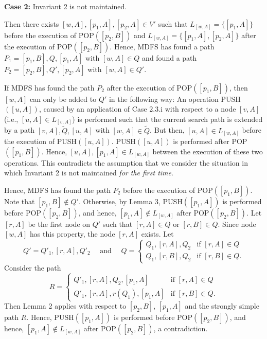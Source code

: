 \documentclass[12pt,twoside,a4paper]{article}
\begin{document}
\medskip
\noindent
{\bf Case 2:} Invariant 2 is not maintained.

\medskip
Then there exists $[w,A],[p_1,A],[p_2,A] \in V'$ such that 
$L_{[w,A]} = \{[p_1,A]\}$ before the execution of POP$([p_2,B])$ and 
$L_{[w,A]} = \{[p_1,A],[p_2,A]\}$  after the execution of POP$([p_2,B])$.
Hence, MDFS has found a path $P_1 = [p_1,B],Q,[p_1,A]$ with $[w,A] \in Q$ and 
found a path $P_2 = [p_2,B],Q',[p_2,A]$ with $[w,A] \in Q'$.

If MDFS has found the path $P_2$ after the execution of POP$([p_1,B])$, then
$[w,A]$ can only be added to $Q'$ in the following way:
An operation PUSH$([u,A])$, caused by an application of Case 2.3.i
with respect to a node $[v,A]$ (i.e., $[u,A] \in L_{[v,A]}$) is performed 
such that the current search path is extended by a path $[v,A],\tilde{Q},[u,A]$
with $[w,A] \in \tilde{Q}$.
But then, $[u,A] \in L_{[w,A]}$ before the execution of PUSH$([u,A])$. 
PUSH$([u,A])$ is performed after POP$([p_1,B])$. Hence, $[u,A],[p_1,A]\in 
L_{[w,A]}$ between the execution of these two operations.
This contradicts the assumption that we consider the situation in
which Invariant 2 is not maintained {\em for the first time\/}.

Hence, MDFS has found the path $P_2$ before the execution of POP$([p_1,B])$. 
Note that $[p_1,B] \not\in Q'$. Otherwise, by Lemma 3, 
PUSH$([p_1,A])$ is performed before POP$([p_2,B])$, and hence, $[p_1,A] 
\not\in L_{[w,A]}$ after POP$([p_2,B])$. 
Let $[r,A]$ be the first node on $Q'$ such that $[r,A] \in Q$ or $[r,B] \in
Q$. Since node $[w,A]$ has this property, the node $[r,A]$ exists. Let 
$$Q' = Q'_1,[r,A],Q'_2 \quad \mbox{ and } \quad
Q = \left\{ \begin{array}{ll}
                Q_1,[r,A],Q_2 & \mbox{if $[r,A] \in Q$} \\
                Q_1,[r,B],Q_2 & \mbox{if $[r,B] \in Q$.}
              \end{array}
      \right.$$   
Consider the path
$$R = \left\{ \begin{array}{ll}
                Q'_1,[r,A],Q_2,[p_1,A] & \mbox{if $[r,A] \in Q$} \\
                Q'_1,[r,A],r(Q_1),[p_1,A] & \mbox{if $[r,B] \in Q$.}
              \end{array}
      \right.$$
Then Lemma 2 applies with respect to $[p_2,B]$, $[p_1,A]$ and the
strongly simple path $R$. Hence, PUSH$([p_1,A])$ is performed
before POP$([p_2,B])$, and hence, $[p_1,A] \not\in L_{[w,A]}$
after POP$([p_2,B])$, a contradiction.
\end{document}
